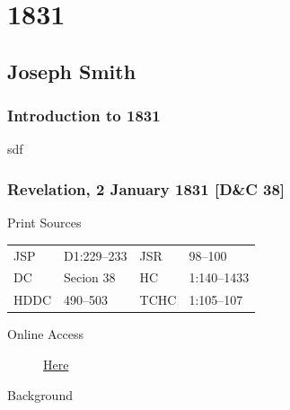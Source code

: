 \section{1831}
	\label{EMS-1831}
	
	\subsection{Joseph Smith}
		\label{EMS-1831-JS}
		
		\subsubsection{Introduction to 1831}
		
			sdf
			
		\subsubsection{Revelation, 2 January 1831 [D\&C 38]}
			\label{EMS-1831-JS-2-JAN-1831}
		
			\begin{description}
				\item[Print Sources]
			\end{description}

				\begin{tabular}{p{0.5in}p{1in}p{0.5in}p{1in}}
				JSP	 	& D1:229--233	& JSR 		& 98--100 \\
				DC	 	& Secion 38	 	& HC 		& 1:140--1433 \\
				HDDC 	& 490--503		& TCHC 		& 1:105--107 \\
				\end{tabular}
			
			\begin{description}
				\item[Online Access] \href{https://www.josephsmithpapers.org/paper-summary/revelation-2-january-1831-dc-38/1}{Here}
			\end{description}
			
			\begin{description}
				\item[Background]
			\end{description}
			
